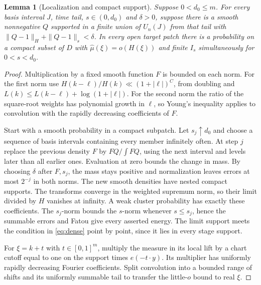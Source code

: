 \documentclass[11pt,a4paper,reqno]{amsart}
\newtheorem{lemma}[theorem]{Lemma}
\theoremstyle{definition}
\theoremstyle{remark}
\numberwithin{equation}{section}
\begin{document}
\begin{lemma}[Localization and compact support]\label{lem:compact}
Suppose \(0<d_0\le m\). For every basis interval \(J\), time tail,
\(s\in(0,d_0)\) and \(\delta>0\), suppose there is a smooth nonnegative
\(Q\) supported in a finite union of \(U_n(J)\) from that tail with
\(\|Q-1\|_H+\|Q-1\|_s<\delta\). In every open target patch there is a
probability on a compact subset of \(D\) with \(\widehat\mu(\xi)=o(H(\xi))\)
and finite \(I_s\) simultaneously for \(0<s<d_0\).
\end{lemma}
\begin{proof}
Multiplication by a fixed smooth function \(F\) is bounded on each norm.
For the first norm use \(H(k-\ell)/H(k)\ll(1+|\ell|)^C\), from doubling
and \(L(k)\le L(k-\ell)+\log(1+|\ell|)\). For the second norm the ratio
of the square-root weights has polynomial growth in \(\ell\), so Young's
inequality applies to convolution with the rapidly decreasing coefficients
of \(F\).

Start with a smooth probability in a compact subpatch. Let \(s_j\uparrow d_0\)
and choose a sequence of basis intervals containing every member
infinitely often. At step \(j\) replace the previous density \(F\) by
\(FQ/\int FQ\), using the next interval and levels later than all earlier
ones. Evaluation at zero bounds the change in mass. By choosing \(\delta\)
after \(F,s_j\), the mass stays positive and normalization leaves errors
at most \(2^{-j}\) in both norms. The new smooth densities have nested
compact supports. The transforms converge in the weighted supremum norm,
so their limit divided by \(H\) vanishes at infinity. A weak cluster
probability has exactly these coefficients. The \(s_j\)-norm bounds the
\(s\)-norm whenever \(s\le s_j\), hence the summable errors and Fatou give
every asserted energy. The limit support meets the condition in
\eqref{eq:dense} point by point, since it lies in every stage support.

For \(\xi=k+t\) with \(t\in[0,1]^m\), multiply the measure in its local
lift by a chart cutoff equal to one on the support times \(e(-t\cdot y)\).
Its multiplier has uniformly rapidly decreasing Fourier coefficients.
Split convolution into a bounded range of shifts and its uniformly
summable tail to transfer the little-\(o\) bound to real \(\xi\).
\end{proof}
\end{document}
